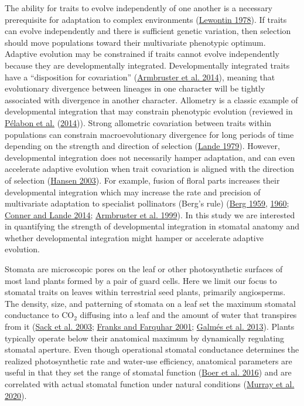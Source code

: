 \documentclass[
  10pt,
]{article}
\begin{document}
The ability for traits to evolve independently of one another is a necessary prerequisite for adaptation to complex environments (\protect\hyperlink{ref-lewontin_adaptation_1978}{Lewontin 1978}). If traits can evolve independently and there is sufficient genetic variation, then selection should move populations toward their multivariate phenotypic optimum. Adaptive evolution may be constrained if traits cannot evolve independently because they are developmentally integrated. Developmentally integrated traits have a ``disposition for covariation'' (\protect\hyperlink{ref-armbruster_integrated_2014}{Armbruster et al. 2014}), meaning that evolutionary divergence between lineages in one character will be tightly associated with divergence in another character. Allometry is a classic example of developmental integration that may constrain phenotypic evolution (reviewed in \protect\hyperlink{ref-pelabon_evolution_2014}{Pélabon et al.} (\protect\hyperlink{ref-pelabon_evolution_2014}{2014})). Strong allometric covariation between traits within populations can constrain macroevolutionary divergence for long periods of time depending on the strength and direction of selection (\protect\hyperlink{ref-lande_quantitative_1979}{Lande 1979}). However, developmental integration does not necessarily hamper adaptation, and can even accelerate adaptive evolution when trait covariation is aligned with the direction of selection (\protect\hyperlink{ref-hansen_is_2003}{Hansen 2003}). For example, fusion of floral parts increases their developmental integration which may increase the rate and precision of multivariate adaptation to specialist pollinators (Berg's rule) (\protect\hyperlink{ref-berg_general_1959}{Berg 1959}, \protect\hyperlink{ref-berg_ecological_1960}{1960}; \protect\hyperlink{ref-conner_raissa_2014}{Conner and Lande 2014}; \protect\hyperlink{ref-armbruster_covariance_1999}{Armbruster et al. 1999}). In this study we are interested in quantifying the strength of developmental integration in stomatal anatomy and whether developmental integration might hamper or accelerate adaptive evolution.

Stomata are microscopic pores on the leaf or other photosynthetic surfaces of most land plants formed by a pair of guard cells. Here we limit our focus to stomatal traits on leaves within terrestrial seed plants, primarily angiosperms. The density, size, and patterning of stomata on a leaf set the maximum stomatal conductance to CO\(_2\) diffusing into a leaf and the amount of water that transpires from it (\protect\hyperlink{ref-sack_hydrology_2003}{Sack et al. 2003}; \protect\hyperlink{ref-franks_effect_2001}{Franks and Farquhar 2001}; \protect\hyperlink{ref-galmes_leaf_2013}{Galmés et al. 2013}). Plants typically operate below their anatomical maximum by dynamically regulating stomatal aperture. Even though operational stomatal conductance determines the realized photosynthetic rate and water-use efficiency, anatomical parameters are useful in that they set the range of stomatal function (\protect\hyperlink{ref-de_boer_optimal_2016}{Boer et al. 2016}) and are correlated with actual stomatal function under natural conditions (\protect\hyperlink{ref-murray_consistent_2020}{Murray et al. 2020}).
\end{document}
